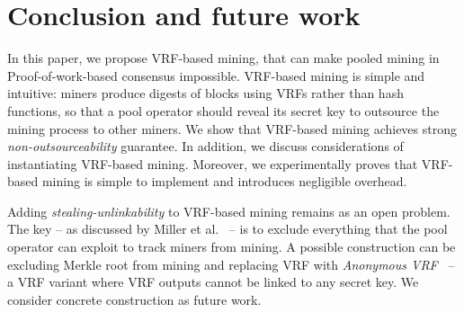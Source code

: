 \section{Conclusion and future work}
\label{sec:conclusion}

In this paper, we propose VRF-based mining, that can make pooled mining in Proof-of-work-based consensus impossible.
VRF-based mining is simple and intuitive: miners produce digests of blocks using VRFs rather than hash functions, so that a pool operator should reveal its secret key to outsource the mining process to other miners.
We show that VRF-based mining achieves strong \emph{non-outsourceability} guarantee.
In addition, we discuss considerations of instantiating VRF-based mining.
Moreover, we experimentally proves that VRF-based mining is simple to implement and introduces negligible overhead.

Adding \emph{stealing-unlinkability} to VRF-based mining remains as an open problem.
The key -- as discussed by Miller et al.~\cite{miller2015nonoutsourceable} -- is to exclude everything that the pool operator can exploit to track miners from mining.
A possible construction can be excluding Merkle root from mining and replacing VRF with \emph{Anonymous VRF}~\cite{ganesh2019proof} -- a VRF variant where VRF outputs cannot be linked to any secret key.
We consider concrete construction as future work.